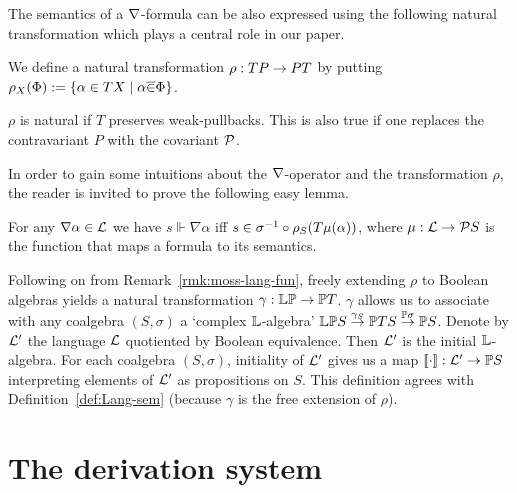 \documentclass{book}
\begin{document}
The semantics of a $\nabla$-formula can be also expressed using the
following natural transformation which plays a central role in our
paper.
\begin{definition}
\label{def:TP-PT}
We define a natural transformation $\rho: TP \to
PT$ by putting $\rho_{X}(\Phi) := \{ \alpha \in T X
\mid \alpha \overline{\in} \Phi \}$.
\end{definition}
\begin{remark}
  $\rho$ is natural if $T$ preserves weak-pullbacks. This is also true
  if one replaces the contravariant $P$ with the covariant $\cal P$.
\end{remark}
In order to gain some intuitions about the $\nabla$-operator and 
the transformation $\rho$, the reader is invited to prove the following
easy lemma.
\begin{lemma}
\label{l:altsem}
For any $\nabla \alpha \in \mathcal{L}$ we have $s\Vdash\nabla\alpha$ iff
$s\in\sigma^{-1}\circ\rho_S(T\mu (\alpha))$, where
$\mu: \mathcal{L} \to \mathcal{P} S$ is the function that maps a formula
to its semantics. 
\end{lemma}

\begin{remark}\label{rmk:moss-lang-fun-2}
Following on from  Remark~\ref{rmk:moss-lang-fun}, freely extending $\rho$
to Boolean algebras yields a natural transformation
$\gamma:{\mathbb{L}}\mathbb{P}\to\mathbb{P} T$. $\gamma$  
allows us to associate with any coalgebra $(S,\sigma)$ a `complex
${\mathbb{L}}$-algebra' ${\mathbb{L}}\mathbb{P} S \stackrel{\gamma_{S}}{\to} \mathbb{P}T S
\stackrel{\mathbb{P}\sigma}{\to} \mathbb{P} S$.  Denote by $\mathcal{L}'$ the language
$\mathcal{L}$ quotiented by Boolean equivalence.  Then $\mathcal{L}'$ is the
initial ${\mathbb{L}}$-algebra. For each coalgebra $(S,\sigma)$, initiality of
$\mathcal{L}'$ gives us a map $\mathopen{[\![} \cdot \mathclose{]\!]}:\mathcal{L}'\to\mathbb{P} S$ interpreting
elements of $\mathcal{L}'$ as propositions on $S$. This definition agrees
with Definition~\ref{def:Lang-sem} (because $\gamma$ is the free
extension of $\rho$).
\end{remark}



%
\section{The derivation system}
\end{document}
